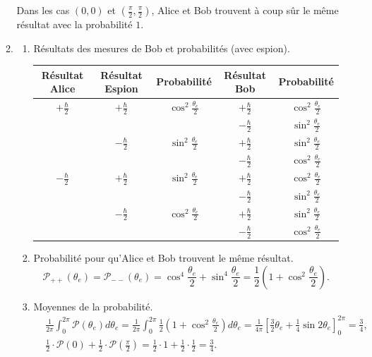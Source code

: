 \begin{enumerate}
\begin{enumerate}
Dans les cas $(0,0)$ et $(\frac{\pi}{2},\frac{\pi}{2})$, Alice et Bob trouvent
à coup sûr le même résultat avec la probabilité $1$.

\item 
\begin{enumerate}
 \item Résultats des mesures de Bob et probabilités (avec espion).
\begin{center}
\begin{tabular}{|c|c|c|c|c|}\hline
Résultat Alice & Résultat Espion & Probabilité& Résultat Bob & 
Probabilité\\\hline
 $+\frac{\hbar}{2}$ & $+\frac{\hbar}{2}$ & $\cos^2\frac{\theta_e}{2}$ & 
$+\frac{\hbar}{2}$ & $\cos^2\frac{\theta_e}{2}$\\\cline{4-5}
  &  &   & $-\frac{\hbar}{2}$ & $\sin^2\frac{\theta_e}{2}$\\\cline{2-5}
   & $-\frac{\hbar}{2}$ & $\sin^2\frac{\theta_e}{2}$ & 
$+\frac{\hbar}{2}$ & $\sin^2\frac{\theta_e}{2}$\\\cline{4-5}
  &  &   & $-\frac{\hbar}{2}$ & $\cos^2\frac{\theta_e}{2}$\\\hline
  $-\frac{\hbar}{2}$ & $+\frac{\hbar}{2}$ & $\sin^2\frac{\theta_e}{2}$ & 
$+\frac{\hbar}{2}$ & $\cos^2\frac{\theta_e}{2}$\\\cline{4-5}
  &  &   & $-\frac{\hbar}{2}$ & $\sin^2\frac{\theta_e}{2}$\\\cline{2-5}
   & $-\frac{\hbar}{2}$ & $\cos^2\frac{\theta_e}{2}$ & 
$+\frac{\hbar}{2}$ & $\sin^2\frac{\theta_e}{2}$\\\cline{4-5}
  &  &   & $-\frac{\hbar}{2}$ & $\cos^2\frac{\theta_e}{2}$\\\hline
\end{tabular}
\end{center}

\item Probabilité pour qu'Alice et Bob trouvent le même résultat.
\begin{equation}
\mathcal{P}_{++}(\theta_e)=\mathcal{P}_{--}(\theta_e)=\cos^4\frac{\theta_e}{2}
+\sin^4\frac{\theta_e}{2}=\frac{1}{2}(1+\cos^2\frac{\theta_e}{2}).
      \end{equation}


\item \label{item} Moyennes de la probabilité.
\begin{align}
&\frac{1}{2\pi}\int_0^{2\pi}\mathcal{P}(\theta_e)d\theta_e 
=\frac{1}{2\pi}\int_0^
{2\pi}\frac{1}{2}(1+\cos^2\frac{\theta_e}{2})d\theta_e
=\frac{1}{4\pi}\left[\frac{3}{2}\theta_e+\frac{1}{4}\sin2\theta_e\right]^{2\pi}
_0=\frac{3}{4},\\
& \frac{1}{2}\cdot\mathcal{P}(0)+\frac{1}{2}\cdot\mathcal{P}(\frac{\pi}{2})
=\frac{1}{2}\cdot1+\frac{1}{2}\cdot\frac{1}{2}=\frac{3}{4}.
\end{align}
\end{enumerate}
\end{enumerate}


\end{enumerate}
